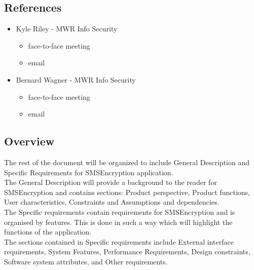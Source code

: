 \subsection{References}
\begin{itemize}
\item{Kyle Riley - MWR Info Security}
\begin{itemize}
\item face-to-face meeting
\item email
\end{itemize}

\item{Bernard Wagner - MWR Info Security}
\begin{itemize}
\item face-to-face meeting
\item email
\end{itemize}
\end{itemize}

\subsection{Overview}
The rest of the document will be organized to include General Description and Specific Requirements for SMSEncryption application.
\vspace{10pt}\\
The General Description will provide a background to the reader for SMSEncryption and contains sections: Product perspective, Product functions, User characteristics, Constraints and Assumptions and dependencies.
\vspace{10pt}\\
The Specific requirements contain requirements for SMSEncryption and is organised by features. This is done in such a way which will highlight the functions of the application. 
\vspace{10pt}\\
The sections contained in Specific requirements include External interface requirements, System Features, Performance Requirements, Design constraints, Software system attributes, and Other requirements.
\vspace{10pt}


